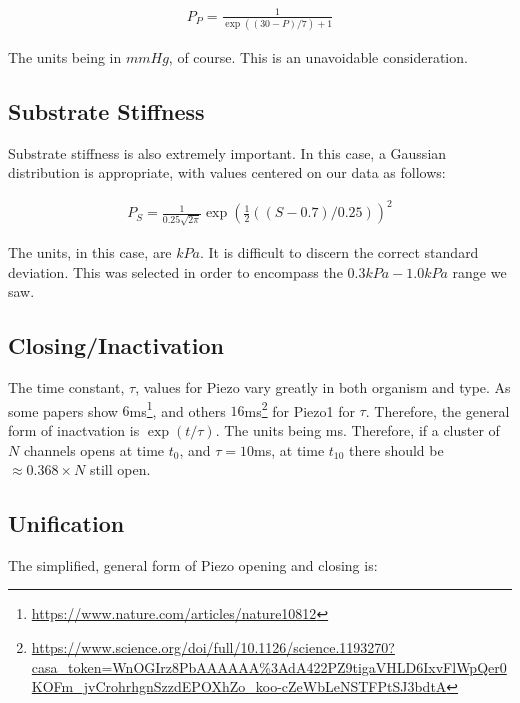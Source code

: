 \documentclass[12pt]{amsart}
\newcommand{\pr}[1]{\left(#1\right)}
\begin{document}
\begin{equation} \label{eq8}
\begin{split}
P_P = \frac{1}{\exp\pr{\pr{30 - P}/7} + 1}
\end{split}
\end{equation}

\bigskip

The units being in $mmHg$, of course. This is an unavoidable consideration. 

\subsection{Substrate Stiffness} Substrate stiffness is also extremely important. In this case, a Gaussian distribution is appropriate, with values centered on our data as follows: 

\bigskip

\begin{equation} \label{eq8}
\begin{split}
P_S = \frac{1}{0.25\sqrt{2 \pi}}\exp\pr{\frac{1}{2}\pr{\pr{S - 0.7}/0.25}}^2
\end{split}
\end{equation}


\bigskip

The units, in this case, are $kPa$. It is difficult to discern the correct standard deviation. This was selected in order to encompass the $0.3kPa-1.0kPa$ range we saw. 

\subsection{Closing/Inactivation} The time constant, $\tau$, values for Piezo vary greatly in both organism and type. As some papers show $6$ms\footnote{\url{https://www.nature.com/articles/nature10812}}, and others $16$ms\footnote{\url{https://www.science.org/doi/full/10.1126/science.1193270?casa_token=WnOGIrz8PbAAAAAA\%3AdA422PZ9tigaVHLD6IxvFlWpQer0KOFm_jvCrohrhgnSzzdEPOXhZo_koo-cZeWbLeNSTFPtSJ3bdtA}} for Piezo1 for $\tau$. Therefore, the general form of inactvation is $\exp(t / \tau)$. The units being ms. Therefore, if a cluster of $N$ channels opens at time $t_0$, and $\tau = 10$ms, at time $t_{10}$ there should be $\approx 0.368 \times N$ still open.  

\subsection{Unification} The simplified, general form of Piezo opening and closing is: 
\end{document}
